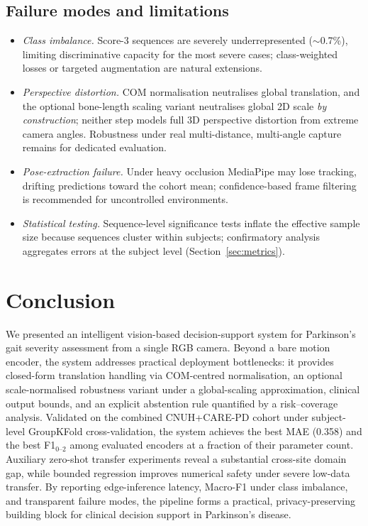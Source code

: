 \documentclass[preprint,12pt]{elsarticle}
\begin{document}
\subsection{Failure modes and limitations}
\label{sec:failure}
\begin{itemize}
    \item \emph{Class imbalance.} Score-3 sequences are severely
    underrepresented ($\sim$0.7\%), limiting discriminative capacity for the most
    severe cases; class-weighted losses or targeted augmentation are natural
    extensions.
    \item \emph{Perspective distortion.} COM normalisation neutralises global
    translation, and the optional bone-length scaling variant neutralises global
    2D scale \emph{by construction}; neither step models full 3D perspective
    distortion from extreme camera angles. Robustness under real
    multi-distance, multi-angle capture remains for dedicated evaluation.
    \item \emph{Pose-extraction failure.} Under heavy occlusion MediaPipe may lose
    tracking, drifting predictions toward the cohort mean; confidence-based frame
    filtering is recommended for uncontrolled environments.
    \item \emph{Statistical testing.} Sequence-level significance tests inflate
    the effective sample size because sequences cluster within subjects;
    confirmatory analysis aggregates errors at the subject level
    (Section~\ref{sec:metrics}).
\end{itemize}

\section{Conclusion}
\label{sec:conclusion}
We presented an intelligent vision-based decision-support system for Parkinson's
gait severity assessment from a single RGB camera. Beyond a bare motion encoder,
the system addresses practical deployment bottlenecks: it provides closed-form
translation handling via COM-centred normalisation, an optional
scale-normalised robustness variant under a global-scaling approximation,
clinical output bounds, and an explicit abstention rule quantified by a
risk--coverage analysis. Validated on the combined CNUH+CARE-PD cohort under
subject-level GroupKFold cross-validation, the system achieves the best MAE
(0.358) and the best F1$_{0\text{--}2}$ among evaluated encoders at a fraction
of their parameter count. Auxiliary zero-shot transfer experiments reveal a
substantial cross-site domain gap, while bounded regression improves numerical
safety under severe low-data transfer. By reporting edge-inference latency,
Macro-F1 under class imbalance, and transparent failure modes, the pipeline
forms a practical, privacy-preserving building block for clinical decision
support in Parkinson's disease.
\end{document}
